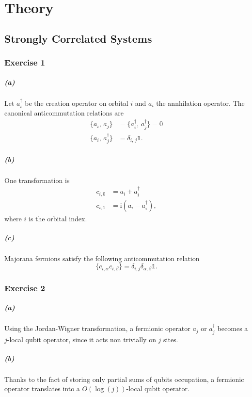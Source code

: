\chapter{Theory}

\section{Strongly Correlated Systems}
\subsection{Exercise 1}
\paragraph*{(a)} Let $a_i^\dagger$ be the creation operator on orbital $i$ and $a_i$ the annhilation operator. The canonical anticommutation relations are
\begin{align}
    \{a_i,\, a_j\} &= \{a_i^\dagger,\, a_j^\dagger\} = 0 \\
    \{a_i,\, a_j^\dagger\} &= \delta_{i,\, j} \mathds{1}.
\end{align}

\paragraph*{(b)} One transformation is
\begin{align}
    c_{i,0} &= a_i + a_i^\dagger \\
    c_{i,1} &= \mathrm{i}(a_i - a_i^\dagger),
\end{align}
where $i$ is the orbital index.

\paragraph*{(c)} Majorana fermions satisfy the following anticommutation relation
\begin{equation}
    \{c_{i,\alpha}c_{i,\beta}\} = \delta_{i,j}\delta_{\alpha,\beta} \mathds{1}.
\end{equation}


\subsection{Exercise 2}
\paragraph*{(a)} Using the Jordan-Wigner transformation, a fermionic operator $a_j$ or $a_j^\dagger$ becomes a $j$-local qubit operator, since it acts non trivially on $j$ sites.

\paragraph*{(b)} Thanks to the fact of storing only partial sums of qubits occupation, a fermionic operator translates into a $O(\log(j))$-local qubit operator.